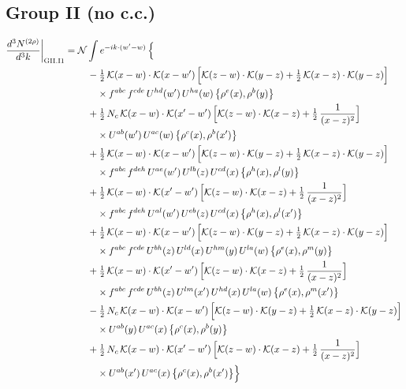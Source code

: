 \documentclass[10pt]{article}
\numberwithin{equation}{section}
\newcommand{\KK}{\mathcal K}
\newcommand{\NN}{\mathcal N}
\begin{document}
\subsection*{Group II (no c.c.)}
\begin{align}
\frac{d^3N^{(2\rho)}}{d^3k}\bigg|_{\rm GII.I1}={}&\NN\int e^{-ik\cdot(w'-w)}\,\Big\{\notag\\
&\quad -\tfrac12\,\KK(x-w)\cdot\KK(x-w')\,\Big[\KK(z-w)\cdot\KK(y-z)+\tfrac12\,\KK(x-z)\cdot\KK(y-z)\Big]\notag\\
&\qquad\times f^{abc}\,f^{cde}\,U^{hd}(w')\,U^{ha}(w)\,\big\{\rho^{e}(x),\rho^{b}(y)\big\}\notag\\
&\quad +\tfrac12\,N_{c}\,\KK(x-w)\cdot\KK(x'-w')\,\Big[\KK(z-w)\cdot\KK(x-z)+\tfrac12\,\frac{1}{(x-z)^2}\Big]\notag\\
&\qquad\times U^{ab}(w')\,U^{ac}(w)\,\big\{\rho^{c}(x),\rho^{b}(x')\big\}\notag\\
&\quad +\tfrac12\,\KK(x-w)\cdot\KK(x-w')\,\Big[\KK(z-w)\cdot\KK(y-z)+\tfrac12\,\KK(x-z)\cdot\KK(y-z)\Big]\notag\\
&\qquad\times f^{abc}\,f^{deh}\,U^{ae}(w')\,U^{lb}(z)\,U^{cd}(x)\,\big\{\rho^{h}(x),\rho^{l}(y)\big\}\notag\\
&\quad +\tfrac12\,\KK(x-w)\cdot\KK(x'-w')\,\Big[\KK(z-w)\cdot\KK(x-z)+\tfrac12\,\frac{1}{(x-z)^2}\Big]\notag\\
&\qquad\times f^{abc}\,f^{deh}\,U^{al}(w')\,U^{eb}(z)\,U^{cd}(x)\,\big\{\rho^{h}(x),\rho^{l}(x')\big\}\notag\\
&\quad +\tfrac12\,\KK(x-w)\cdot\KK(x-w')\,\Big[\KK(z-w)\cdot\KK(y-z)+\tfrac12\,\KK(x-z)\cdot\KK(y-z)\Big]\notag\\
&\qquad\times f^{abc}\,f^{cde}\,U^{bh}(z)\,U^{ld}(x)\,U^{hm}(y)\,U^{la}(w)\,\big\{\rho^{e}(x),\rho^{m}(y)\big\}\notag\\
&\quad +\tfrac12\,\KK(x-w)\cdot\KK(x'-w')\,\Big[\KK(z-w)\cdot\KK(x-z)+\tfrac12\,\frac{1}{(x-z)^2}\Big]\notag\\
&\qquad\times f^{abc}\,f^{cde}\,U^{bh}(z)\,U^{lm}(x')\,U^{hd}(x)\,U^{la}(w)\,\big\{\rho^{e}(x),\rho^{m}(x')\big\}\notag\\
&\quad -\tfrac12\,N_{c}\,\KK(x-w)\cdot\KK(x-w')\,\Big[\KK(z-w)\cdot\KK(y-z)+\tfrac12\,\KK(x-z)\cdot\KK(y-z)\Big]\notag\\
&\qquad\times U^{ab}(y)\,U^{ac}(x)\,\big\{\rho^{c}(x),\rho^{b}(y)\big\}\notag\\
&\quad +\tfrac12\,N_{c}\,\KK(x-w)\cdot\KK(x'-w')\,\Big[\KK(z-w)\cdot\KK(x-z)+\tfrac12\,\frac{1}{(x-z)^2}\Big]\notag\\
&\qquad\times U^{ab}(x')\,U^{ac}(x)\,\big\{\rho^{c}(x),\rho^{b}(x')\big\}\Big\}\label{R:eq:sum-GII.I1}
\end{align}
\end{document}
